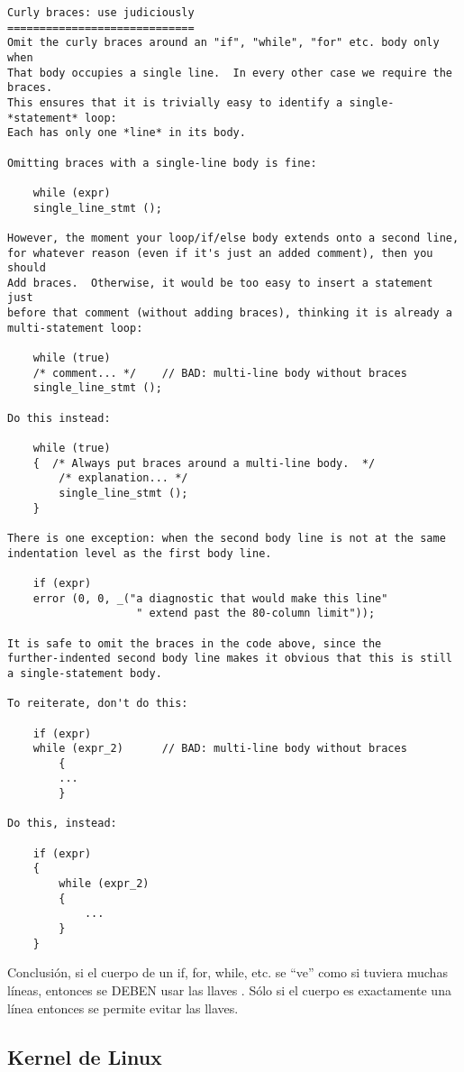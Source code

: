 \begin{verbatim}
Curly braces: use judiciously
=============================
Omit the curly braces around an "if", "while", "for" etc. body only when
That body occupies a single line.  In every other case we require the braces.
This ensures that it is trivially easy to identify a single-*statement* loop:
Each has only one *line* in its body.

Omitting braces with a single-line body is fine:

 	while (expr)
   	single_line_stmt ();

However, the moment your loop/if/else body extends onto a second line,
for whatever reason (even if it's just an added comment), then you should
Add braces.  Otherwise, it would be too easy to insert a statement just
before that comment (without adding braces), thinking it is already a
multi-statement loop:

 	while (true)
   	/* comment... */  	// BAD: multi-line body without braces
   	single_line_stmt ();

Do this instead:

 	while (true)
   	{  /* Always put braces around a multi-line body.  */
     	/* explanation... */
     	single_line_stmt ();
   	}

There is one exception: when the second body line is not at the same
indentation level as the first body line.

 	if (expr)
   	error (0, 0, _("a diagnostic that would make this line"
                  	" extend past the 80-column limit"));

It is safe to omit the braces in the code above, since the
further-indented second body line makes it obvious that this is still
a single-statement body.

To reiterate, don't do this:

 	if (expr)
   	while (expr_2)    	// BAD: multi-line body without braces
     	{
       	...
     	}

Do this, instead:

 	if (expr)
   	{
     	while (expr_2)
       	{
         	...
       	}
   	}
\end{verbatim}

{Conclusión, si el cuerpo de un if, for, while, etc. se “ve” como si tuviera muchas líneas, entonces se DEBEN usar las llaves {}. Sólo si el cuerpo es exactamente una línea entonces se permite evitar las llaves.}

\subsection{Kernel de Linux}

